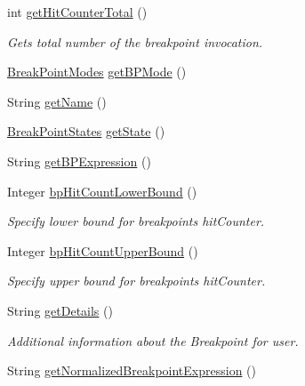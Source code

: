 \begin{DoxyCompactItemize}
int \hyperlink{classgov_1_1nasa_1_1jpf_1_1inspector_1_1server_1_1breakpoints_1_1_break_point_status_impl_adadeb33c3d6f89cba5485bc2b89a7060}{get\+Hit\+Counter\+Total} ()
\begin{DoxyCompactList}\small\item\em Gets total number of the breakpoint invocation. \end{DoxyCompactList}\item 
\hyperlink{enumgov_1_1nasa_1_1jpf_1_1inspector_1_1server_1_1breakpoints_1_1_break_point_modes}{Break\+Point\+Modes} \hyperlink{classgov_1_1nasa_1_1jpf_1_1inspector_1_1server_1_1breakpoints_1_1_break_point_status_impl_a3810525395b6ebf901b9c45fc5c6bd3a}{get\+B\+P\+Mode} ()
\item 
String \hyperlink{classgov_1_1nasa_1_1jpf_1_1inspector_1_1server_1_1breakpoints_1_1_break_point_status_impl_a7d69cad483a1ac9dc02e4f4459ec2a6d}{get\+Name} ()
\item 
\hyperlink{enumgov_1_1nasa_1_1jpf_1_1inspector_1_1interfaces_1_1_break_point_states}{Break\+Point\+States} \hyperlink{classgov_1_1nasa_1_1jpf_1_1inspector_1_1server_1_1breakpoints_1_1_break_point_status_impl_a7c48557c379be25a094fac839a9128b4}{get\+State} ()
\item 
String \hyperlink{classgov_1_1nasa_1_1jpf_1_1inspector_1_1server_1_1breakpoints_1_1_break_point_status_impl_a2c106060493596a61ce4cf28cc3f4e8f}{get\+B\+P\+Expression} ()
\item 
Integer \hyperlink{classgov_1_1nasa_1_1jpf_1_1inspector_1_1server_1_1breakpoints_1_1_break_point_status_impl_a50d8d5bd12ae0e575edd46ae3160e95d}{bp\+Hit\+Count\+Lower\+Bound} ()
\begin{DoxyCompactList}\small\item\em Specify lower bound for breakpoint\textquotesingle{}s hit\+Counter. \end{DoxyCompactList}\item 
Integer \hyperlink{classgov_1_1nasa_1_1jpf_1_1inspector_1_1server_1_1breakpoints_1_1_break_point_status_impl_aee4da392b6d31c578fa9471d262026af}{bp\+Hit\+Count\+Upper\+Bound} ()
\begin{DoxyCompactList}\small\item\em Specify upper bound for breakpoint\textquotesingle{}s hit\+Counter. \end{DoxyCompactList}\item 
String \hyperlink{classgov_1_1nasa_1_1jpf_1_1inspector_1_1server_1_1breakpoints_1_1_break_point_status_impl_ae46a6e147e877a94e69b881e440e38ca}{get\+Details} ()
\begin{DoxyCompactList}\small\item\em Additional information about the Breakpoint for user. \end{DoxyCompactList}\item 
String \hyperlink{classgov_1_1nasa_1_1jpf_1_1inspector_1_1server_1_1breakpoints_1_1_break_point_status_impl_a0c5a9b2446bff15b00e58240c14de583}{get\+Normalized\+Breakpoint\+Expression} ()
\end{DoxyCompactItemize}
